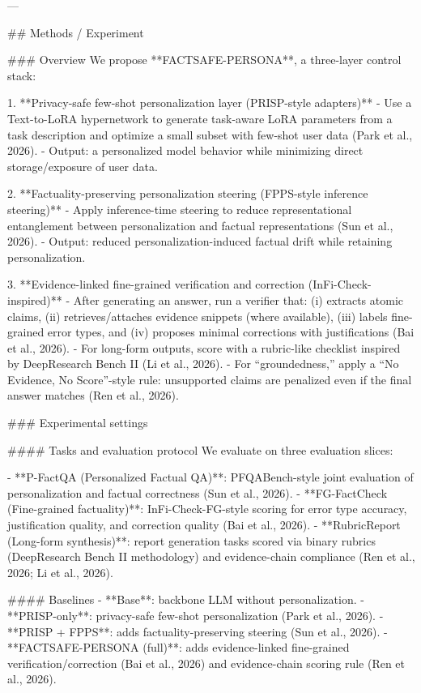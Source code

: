 ---

## Methods / Experiment  

### Overview  
We propose **FACTSAFE-PERSONA**, a three-layer control stack:

1. **Privacy-safe few-shot personalization layer (PRISP-style adapters)**  
   - Use a Text-to-LoRA hypernetwork to generate task-aware LoRA parameters from a task description and optimize a small subset with few-shot user data (Park et al., 2026).  
   - Output: a personalized model behavior while minimizing direct storage/exposure of user data.

2. **Factuality-preserving personalization steering (FPPS-style inference steering)**  
   - Apply inference-time steering to reduce representational entanglement between personalization and factual representations (Sun et al., 2026).  
   - Output: reduced personalization-induced factual drift while retaining personalization.

3. **Evidence-linked fine-grained verification and correction (InFi-Check-inspired)**  
   - After generating an answer, run a verifier that:  
     (i) extracts atomic claims,  
     (ii) retrieves/attaches evidence snippets (where available),  
     (iii) labels fine-grained error types, and  
     (iv) proposes minimal corrections with justifications (Bai et al., 2026).  
   - For long-form outputs, score with a rubric-like checklist inspired by DeepResearch Bench II (Li et al., 2026).  
   - For “groundedness,” apply a “No Evidence, No Score”-style rule: unsupported claims are penalized even if the final answer matches (Ren et al., 2026).

### Experimental settings  

#### Tasks and evaluation protocol  
We evaluate on three evaluation slices:

- **P-FactQA (Personalized Factual QA)**: PFQABench-style joint evaluation of personalization and factual correctness (Sun et al., 2026).  
- **FG-FactCheck (Fine-grained factuality)**: InFi-Check-FG-style scoring for error type accuracy, justification quality, and correction quality (Bai et al., 2026).  
- **RubricReport (Long-form synthesis)**: report generation tasks scored via binary rubrics (DeepResearch Bench II methodology) and evidence-chain compliance (Ren et al., 2026; Li et al., 2026).

#### Baselines  
- **Base**: backbone LLM without personalization.  
- **PRISP-only**: privacy-safe few-shot personalization (Park et al., 2026).  
- **PRISP + FPPS**: adds factuality-preserving steering (Sun et al., 2026).  
- **FACTSAFE-PERSONA (full)**: adds evidence-linked fine-grained verification/correction (Bai et al., 2026) and evidence-chain scoring rule (Ren et al., 2026).

